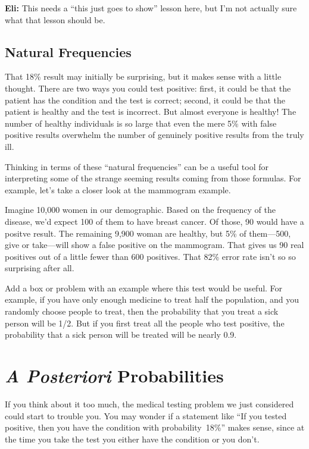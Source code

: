 \begin{editingnotes}
\textbf{Eli:} This needs a ``this just goes to show'' lesson here, but I'm not
actually sure what that lesson should be.
\end{editingnotes}

\subsection{Natural Frequencies}

That 18\% result may initially be surprising, but it makes sense with
a little thought.  There are two ways you could test positive: first,
it could be that the patient has the condition and the test is
correct; second, it could be that the patient is healthy and the test
is incorrect.  But almost everyone is healthy!  The number of healthy
individuals is so large that even the mere 5\% with false positive
results overwhelm the number of genuinely positive results from the
truly ill.

Thinking in terms of these ``natural frequencies'' can be a useful
tool for interpreting some of the strange seeming results coming from
those formulas.  For example, let's take a closer look at the
mammogram example.

Imagine 10,000 women in our demographic.  Based on the frequency of
the disease, we'd expect 100 of them to have breast cancer.  Of those,
90 would have a positve result.  The remaining 9,900 woman are healthy,
but 5\% of them---500, give or take---will show a false positive on
the mammogram.  That gives us 90 real positives out of a little fewer
than 600 positives.  That 82\% error rate isn't so so surprising after all.

\begin{editingnotes}
Add a box or problem with an example where this test would be useful.
For example, if you have only enough medicine to treat half the
population, and you randomly choose people to treat, then the
probability that you treat a sick person will be 1/2.  But if you
first treat all the people who test positive, the probability that a
sick person will be treated will be nearly 0.9.
\end{editingnotes}


\section{\emph{A Posteriori} Probabilities}\label{aposteriori_subsec}

If you think about it too much, the medical testing problem we just
considered could start to trouble you.  You may wonder if a statement
like ``If you tested positive, then you have the condition with
probability~18\%'' makes sense, since at the time you take the test
you either have the condition or you don't.

